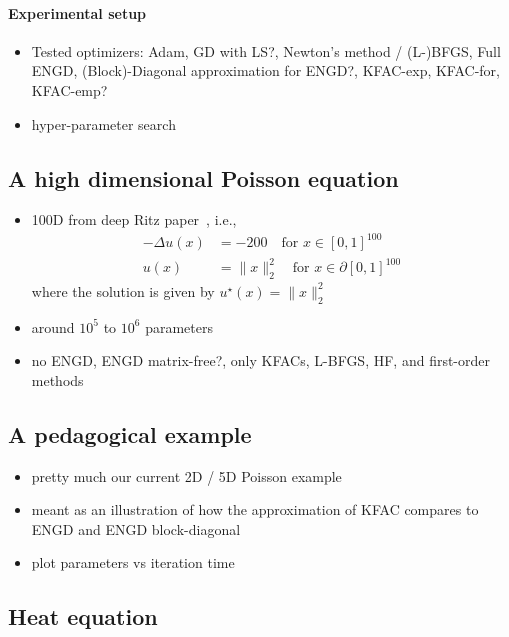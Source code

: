 \paragraph{Experimental setup}
\begin{itemize}
    \item Tested optimizers: Adam, GD with LS?, Newton's method / (L-)BFGS, Full ENGD, (Block)-Diagonal approximation for ENGD?, KFAC-exp, KFAC-for, KFAC-emp? %
    \item hyper-parameter search 
\end{itemize}

\subsection{A high dimensional Poisson equation}

\begin{itemize}
    \item 100D from deep Ritz paper~\citep{yu2018deep}, i.e., 
    \begin{align*}
        -\Delta u(x) & = -200 \quad \text{for } x\in [0,1]^{100} \\ 
        u(x) & = \lVert x \rVert_2^2 \quad \text{for } x\in \partial[0,1]^{100}
    \end{align*}
    where the solution is given by $u^\star(x) = \lVert x \rVert_2^2$
    \item around $10^5$ to $10^6$ parameters 
    \item no ENGD, ENGD matrix-free?, only KFACs, L-BFGS, HF, and first-order methods 
\end{itemize}

\subsection{A pedagogical example}

\begin{itemize}
    \item pretty much our current 2D / 5D Poisson example
    \item meant as an illustration of how the approximation of KFAC compares to ENGD and ENGD block-diagonal 
    \item plot parameters vs iteration time 
\end{itemize}

\subsection{Heat equation}

